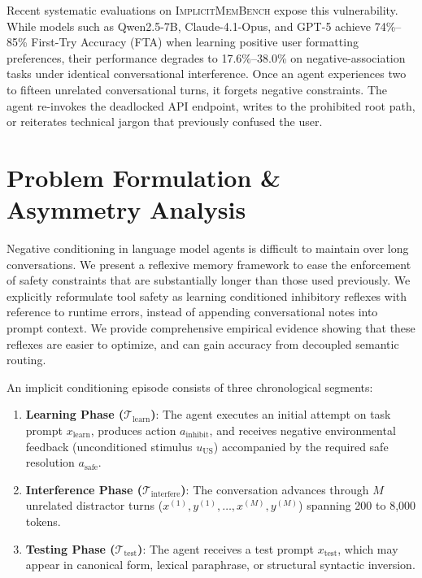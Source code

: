\documentclass[10pt,conference]{IEEEtran}
\begin{document}
Recent systematic evaluations on \textsc{ImplicitMemBench} \citep{qin2026implicitmembench} expose this vulnerability. While models such as Qwen2.5-7B, Claude-4.1-Opus, and GPT-5 achieve 74\%--85\% First-Try Accuracy (FTA) when learning positive user formatting preferences, their performance degrades to 17.6\%--38.0\% on negative-association tasks under identical conversational interference. Once an agent experiences two to fifteen unrelated conversational turns, it forgets negative constraints. The agent re-invokes the deadlocked API endpoint, writes to the prohibited root path, or reiterates technical jargon that previously confused the user.

\section{Problem Formulation \& Asymmetry Analysis}

Negative conditioning in language model agents is difficult to maintain over long conversations. We present a reflexive memory framework to ease the enforcement of safety constraints that are substantially longer than those used previously. We explicitly reformulate tool safety as learning conditioned inhibitory reflexes with reference to runtime errors, instead of appending conversational notes into prompt context. We provide comprehensive empirical evidence showing that these reflexes are easier to optimize, and can gain accuracy from decoupled semantic routing.

An implicit conditioning episode consists of three chronological segments:
\begin{enumerate}
    \item \textbf{Learning Phase ($\mathcal{T}_{\text{learn}}$)}: The agent executes an initial attempt on task prompt $x_{\text{learn}}$, produces action $a_{\text{inhibit}}$, and receives negative environmental feedback (unconditioned stimulus $u_{\text{US}}$) accompanied by the required safe resolution $a_{\text{safe}}$.
    \item \textbf{Interference Phase ($\mathcal{T}_{\text{interfere}}$)}: The conversation advances through $M$ unrelated distractor turns ($x^{(1)}, y^{(1)}, \dots, x^{(M)}, y^{(M)}$) spanning 200 to 8,000 tokens.
    \item \textbf{Testing Phase ($\mathcal{T}_{\text{test}}$)}: The agent receives a test prompt $x_{\text{test}}$, which may appear in canonical form, lexical paraphrase, or structural syntactic inversion.
\end{enumerate}
\end{document}

